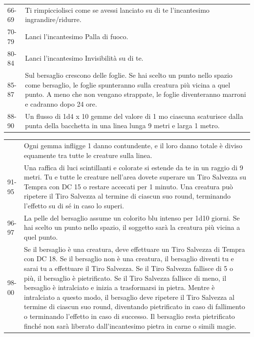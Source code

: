 \begin{multicols}{2}
\begin{tabularx}{\linewidth}{lX}
\rowcolor{gray!20}66-69 &Ti rimpicciolisci come se avessi lanciato su di te l'incantesimo ingrandire/ridurre.\\
70-79 &Lanci l'incantesimo Palla di fuoco.\\
\rowcolor{gray!20}80-84 &Lanci l'incantesimo Invisibilità su di te.\\
85-87 &Sul bersaglio crescono delle foglie. Se hai scelto un punto nello spazio come bersaglio, le foglie spunteranno sulla creatura più vicina a quel punto. A meno che non vengano strappate, le foglie diventeranno marroni e cadranno dopo 24 ore.\\
\rowcolor{gray!20}88-90& Un flusso di 1d4 x 10 gemme del valore di 1 mo ciascuna scaturisce dalla punta della bacchetta in una linea lunga 9 metri e larga 1 metro.\\
\end{tabularx}
\noindent\begin{tabularx}{\linewidth}{lX}
\rowcolor{gray!20}& Ogni gemma infligge 1 danno contundente, e il loro danno totale è diviso equamente tra tutte le creature sulla linea.\\
91-95 &Una raffica di luci scintillanti e colorate si estende da te in un raggio di 9 metri. Tu e tutte le creature nell'area dovete superare un Tiro Salvezza su Tempra con DC 15 o restare accecati per 1 minuto. Una creatura può ripetere il Tiro Salvezza al termine di ciascun suo round, terminando l'effetto su di sé in caso lo superi.\\
\rowcolor{gray!20}96-97 &La pelle del bersaglio assume un colorito blu intenso per 1d10 giorni. Se hai scelto un punto nello spazio, il soggetto sarà la creatura più vicina a quel punto.\\
98-00 &Se il bersaglio è una creatura, deve effettuare un Tiro Salvezza di Tempra con DC 18. Se il bersaglio non è una creatura, il bersaglio diventi tu e sarai tu a effettuare il Tiro Salvezza. Se il Tiro Salvezza fallisce di 5 o più, il bersaglio è pietrificato. Se il Tiro Salvezza fallisce di meno, il bersaglio è intralciato e inizia a trasformarsi in pietra. Mentre è intralciato a questo modo, il bersaglio deve ripetere il Tiro Salvezza al termine di ciascun suo round, diventando pietrificato in caso di fallimento o terminando l'effetto in caso di successo. Il bersaglio resta pietrificato finché non sarà liberato dall'incantesimo pietra in carne o simili magie.\\
\end{tabularx}



\end{multicols}
